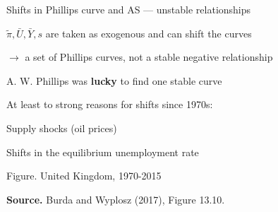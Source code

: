 \documentclass{beamer}
\newenvironment{mytemize}
{\vfill\itemize[nolistsep,itemsep=\fill,label=\color{blue}{$\triangleright$}]}
  {\enditemize}
\begin{document}
\begin{frame}{Shifts in Phillips curve and AS --- unstable relationships}

\begin{mytemize}
\item $\tilde{\pi},\bar{U},\bar{Y},s$ are taken as exogenous and can shift the curves
\item[$\rightarrow$] a set of Phillips curves, not a stable negative relationship
\item A. W. Phillips was \textbf{lucky} to find one stable curve
\item At least to strong reasons for shifts since 1970s:
\begin{mytemize}
\item Supply shocks (oil prices)
\item Shifts in the equilibrium unemployment rate
\end{mytemize}
\end{mytemize}
\begin{center}
{\tiny
Figure. United Kingdom, 1970-2015
}
\vspace{-3mm}
\begin{figure}[h!]
\end{figure}
\begin{minipage}{0.50\columnwidth}
\tiny	
\textbf{Source.} Burda and Wyplosz (2017), Figure 13.10.\\
\end{minipage}
\end{center}

\end{frame}
%
\end{document}
